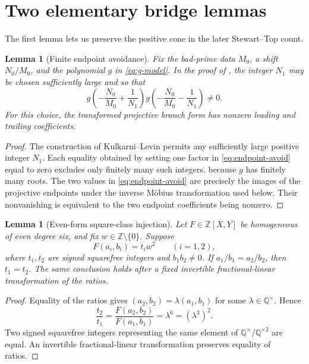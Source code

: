 \documentclass[11pt,reqno]{amsart}
\newtheorem{lemma}[theorem]{Lemma}
\theoremstyle{definition}
\theoremstyle{remark}
\newcommand{\Q}{\mathbb{Q}}
\newcommand{\Z}{\mathbb{Z}}
\begin{document}
\section{Two elementary bridge lemmas}\label{sec:bridge}

The first lemma lets us preserve the positive cone in the later
Stewart--Top count.

\begin{lemma}[Finite endpoint avoidance]\label{lem:endpoint}
Fix the bad-prime data \(M_0\), a shift \(N_0/M_0\), and the polynomial
\(g\) in \eqref{eq:g-model}.  In the proof of
\cite[Lemma~3.1]{KulkarniLevin2022}, the integer \(N_1\) may be chosen
sufficiently large and so that
\begin{equation}\label{eq:endpoint-avoid}
  g\!\left(-\frac{N_0}{M_0}+\frac1{N_1}\right)
  g\!\left(-\frac{N_0}{M_0}-\frac1{N_1}\right)\neq 0.
\end{equation}
For this choice, the transformed projective branch form has nonzero leading
and trailing coefficients.
\end{lemma}

\begin{proof}
The construction of Kulkarni--Levin permits any sufficiently large positive
integer \(N_1\).  Each equality obtained by setting one factor in
\eqref{eq:endpoint-avoid} equal to zero excludes only finitely many such
integers, because \(g\) has finitely many roots.  The two values in
\eqref{eq:endpoint-avoid} are precisely the images of the projective endpoints
under the inverse M\"obius transformation used below.  Their nonvanishing is
equivalent to the two endpoint coefficients being nonzero.
\end{proof}

\begin{lemma}[Even-form square-class injection]\label{lem:injection}
Let \(F\in\Z[X,Y]\) be homogeneous of even degree six, and fix
\(w\in\Z\setminus\{0\}\).  Suppose
\[
  F(a_i,b_i)=t_iw^2\qquad(i=1,2),
\]
where \(t_1,t_2\) are signed squarefree integers and \(b_1b_2\neq0\).  If
\(a_1/b_1=a_2/b_2\), then \(t_1=t_2\).  The same conclusion holds after a
fixed invertible fractional-linear transformation of the ratios.
\end{lemma}

\begin{proof}
Equality of the ratios gives
\((a_2,b_2)=\lambda(a_1,b_1)\) for some \(\lambda\in\Q^\times\).  Hence
\[
  \frac{t_2}{t_1}
  =\frac{F(a_2,b_2)}{F(a_1,b_1)}
  =\lambda^6=(\lambda^3)^2.
\]
Two signed squarefree integers representing the same element of
\(\Q^\times/\Q^{\times2}\) are equal.  An invertible fractional-linear
transformation preserves equality of ratios.
\end{proof}
\end{document}
